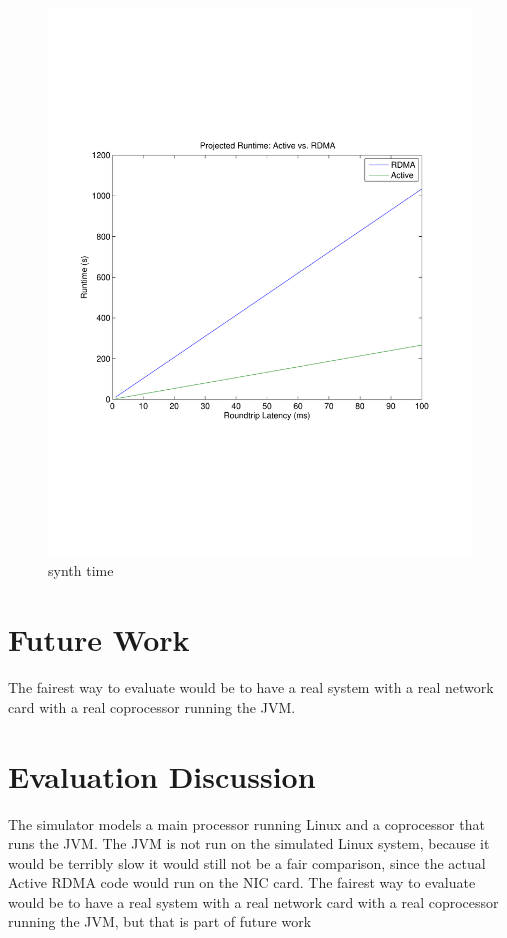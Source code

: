 \documentclass[10pt]{article}
\begin{document}
\begin{figure}
  \centering
\includegraphics[scale=0.5, trim = 0 200 0 200]{../../results/matlab/synth_time.pdf}
  \caption{synth time}\label{synth_time}
\end{figure}



\section{Future Work}
The fairest way to evaluate would be to have a real system with a real network card
with a real coprocessor running the JVM.

\section{Evaluation Discussion}
The simulator models a main processor running Linux and a coprocessor that
runs the JVM. The JVM is not run on the simulated Linux system, because
it would be terribly slow it would still not be a fair comparison, since
the actual Active RDMA code would run on the NIC card. The fairest
way to evaluate would be to have a real system with a real network card
with a real coprocessor running the JVM, but that is part of future work
\end{document}

